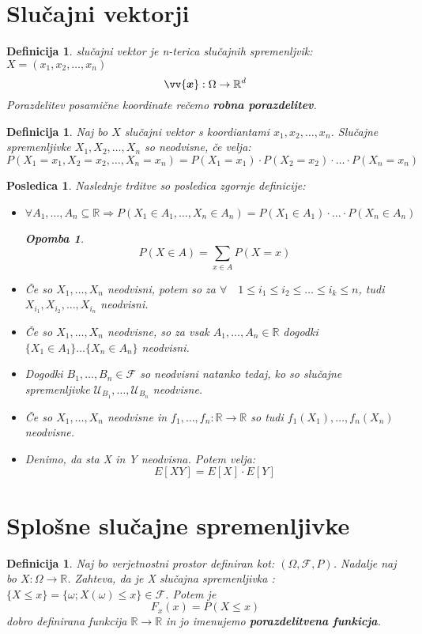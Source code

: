 \documentclass[11pt]{article}
\newtheorem{Posledica}[Izrek]{{\sc Posledica}}
\newtheorem{Definicija}[Izrek]{{\sc Definicija}}
\newtheorem{Opomba}[Izrek]{{\sc Opomba}}
\begin{document}
	\section{Slučajni vektorji}
	\begin{Definicija}
		slučajni vektor je n-terica slučajnih spremenljvik: $X = (x_1, x_2,\dots , x_n)$
		$$ \vv{\bm{x}}: \Omega \to \mathbb{R}^d$$
		Porazdelitev posamične koordinate rečemo \textbf{robna porazdelitev}.
	\end{Definicija}
	\begin{Definicija}
		Naj bo $X$ slučajni vektor s koordiantami $x_1,x_2,\dots, x_n$. Slučajne spremenljivke $X_1,X_2, \dots , X_n$ so neodvisne, če velja:
		$$P(X_1 = x_1, X_2 = x_2,\dotsc, X_n = x_n) = P(X_1 = x_1) \cdot P(X_2 = x_2) \cdot \dotsc \cdot P(X_n = x_n)$$
	\end{Definicija}
	\begin{Posledica}
		Naslednje trditve so posledica zgornje definicije:
		\begin{itemize}
			\item
			$\forall A_1,\dotsc, A_n \subseteq \mathbb{R} \Rightarrow P(X_1 \in A_1, \dotsc, X_n\in A_n) = P(X_1 \in A_1) \cdot \dotsc \cdot P(X_n \in A_n)$
			\begin{Opomba}
				$$P(X\in A ) = \sum_{x\in A}{P(X = x)}$$
			\end{Opomba}
			\item
			Če so $X_1, \dotsc ,X_n$ neodvisni, potem so za $\forall \quad 1\le i_1 \le i_2 \le \dotsc \le i_k\le n$, tudi $X_{i_1}, X_{i_2},\dotsc, X_{i_n}$ neodvisni.
			\item
			Če so $X_1, \dotsc ,X_n$ neodvisne, so za vsak $ A_1,\dotsc, A_n \in \mathbb{R}$ dogodki
			\\
			$\{X_1\in A_1\}\dotsc \{X_n\in A_n \}$ neodvisni.
			\item
			Dogodki $B_1, \dotsc, B_n \in \mathcal{F}$ so neodvisni natanko tedaj, ko so slučajne spremenljivke $ \mathcal{U}_{B_1},\dotsc, \mathcal{U}_{B_n}$ neodvisne.
			\item
			Če so $X_1, \dotsc, X_n$ neodvisne in $f_1,\dotsc,f_n : \mathbb{R} \to \mathbb{R}$ so tudi $f_1(X_1),\dotsc, f_n(X_n)$ neodvisne.
			\item
			Denimo, da sta X in Y neodvisna. Potem velja:
			$$E[XY] = E[X] \cdot E[Y]$$
		\end{itemize}
	\end{Posledica}
\section{Splošne slučajne spremenljivke}
\begin{Definicija}
	Naj bo verjetnostni prostor definiran kot: $(\Omega, \mathcal{F},P)$. Nadalje naj bo $X: \Omega \to \mathbb{R}$. Zahteva, da je X slučajna spremenljivka : $\{ X\le x\} = \{\omega ; X(\omega) \le x\} \in \mathcal{F}$. Potem je $$F_x(x)  = P(X \le x)$$ dobro definirana funkcija $\mathbb{R}\to \mathbb{R}$ in jo imenujemo \textbf{porazdelitvena funkicja}.
\end{Definicija}
\end{document}
